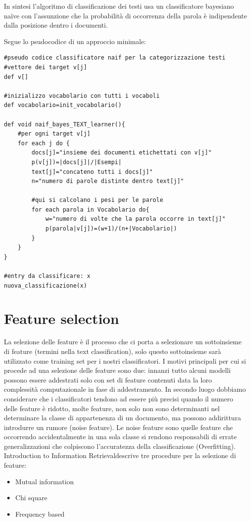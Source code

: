 \documentclass{article}
\theoremstyle{plain}
\theoremstyle{definition}
\begin{document}
In sintesi l'algoritmo di classificazione dei testi usa un classificatore bayesiano naïve con l'assunzione che la probabilità di occorrenza della parola è indipendente dalla posizione dentro i documenti.

Segue lo psudocodice di un approccio minimale:
\begin{lstlisting}
#pseudo codice classificatore naif per la categorizzazione testi
#vettore dei target v[j]
def v[]

#inizializzo vocabolario con tutti i vocaboli
def vocabolario=init_vocabolario()

def void naif_bayes_TEXT_learner(){
	#per ogni target v[j]
	for each j do {
		docs[j]="insieme dei documenti etichettati con v[j]"
		p(v[j])=|docs[j]|/|Esempi|
		text[j]="concateno tutti i docs[j]"
		n="numero di parole distinte dentro text[j]"
		
		#qui si calcolano i pesi per le parole
		for each parola in Vocabolario do{
			w="numero di volte che la parola occorre in text[j]"
			p(parola|v[j])=(w+1)/(n+|Vocabolario|)
		}
	}
}

#entry da classificare: x
nuova_classificazione(x)
\end{lstlisting}




\newpage
\section{Feature selection}
La selezione delle feature è il processo che ci porta a selezionare un sottoinsieme di feature (termini nella text classification), solo questo sottoinsieme sarà utilizzato come training set per i nostri classificatori.
I motivi principali per cui si procede ad una selezione delle feature sono due: innanzi tutto alcuni modelli possono essere addestrati solo con set di feature contenuti data la loro complessità computazionale in fase di addestramento. In secondo luogo dobbiamo considerare che i classificatori tendono ad essere più precisi quando il numero delle feature è ridotto, molte feature, non solo non sono determinanti nel determinare la classe di appartenenza di un documento, ma possono addirittura introdurre un rumore (noise feature). Le noise feature sono quelle feature che occorrendo accidentalmente in una sola classe si rendono responsabili di errate generalizzazioni che colpiscono l'accuratezza della classificazione (Overfitting).
Introduction to Information Retrieval\footnotemark descrive tre procedure per la selezione di feature:
\begin{itemize}  
\item Mutual information
\item Chi square
\item Frequency based
\end{itemize}
\end{document}
